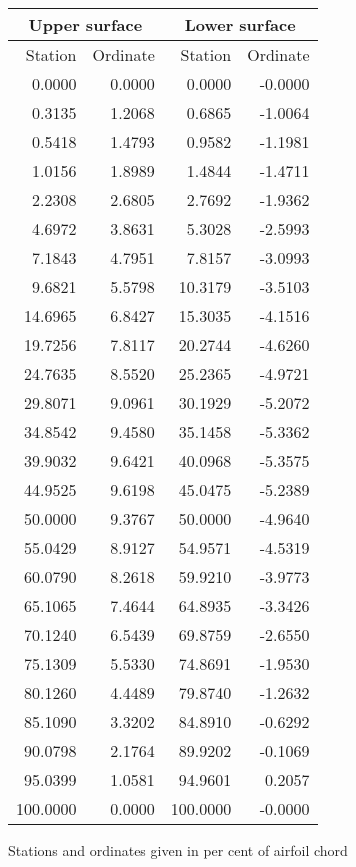 \documentclass[11pt]{book}
\begin{document}
 \hspace{4mm}
 \begin{tabular}{|r|r|r|r|} \hline 
 \multicolumn{2}{|c|}{Upper surface} & \multicolumn{2}{|c|}{Lower surface} \\
 \hline
 Station & Ordinate & Station & Ordinate \\
 \hline
0.0000 & 0.0000 & 0.0000 & -0.0000 \\
0.3135 & 1.2068 & 0.6865 & -1.0064 \\
0.5418 & 1.4793 & 0.9582 & -1.1981 \\
1.0156 & 1.8989 & 1.4844 & -1.4711 \\
2.2308 & 2.6805 & 2.7692 & -1.9362 \\
4.6972 & 3.8631 & 5.3028 & -2.5993 \\
7.1843 & 4.7951 & 7.8157 & -3.0993 \\
9.6821 & 5.5798 & 10.3179 & -3.5103 \\
14.6965 & 6.8427 & 15.3035 & -4.1516 \\
19.7256 & 7.8117 & 20.2744 & -4.6260 \\
24.7635 & 8.5520 & 25.2365 & -4.9721 \\
29.8071 & 9.0961 & 30.1929 & -5.2072 \\
34.8542 & 9.4580 & 35.1458 & -5.3362 \\
39.9032 & 9.6421 & 40.0968 & -5.3575 \\
44.9525 & 9.6198 & 45.0475 & -5.2389 \\
50.0000 & 9.3767 & 50.0000 & -4.9640 \\
55.0429 & 8.9127 & 54.9571 & -4.5319 \\
60.0790 & 8.2618 & 59.9210 & -3.9773 \\
65.1065 & 7.4644 & 64.8935 & -3.3426 \\
70.1240 & 6.5439 & 69.8759 & -2.6550 \\
75.1309 & 5.5330 & 74.8691 & -1.9530 \\
80.1260 & 4.4489 & 79.8740 & -1.2632 \\
85.1090 & 3.3202 & 84.8910 & -0.6292 \\
90.0798 & 2.1764 & 89.9202 & -0.1069 \\
95.0399 & 1.0581 & 94.9601 & 0.2057 \\
100.0000 & 0.0000 & 100.0000 & -0.0000 \\
 \hline 
 \end{tabular}
 \vspace{8mm}

Stations and ordinates given in per cent of airfoil chord
\end{document}
